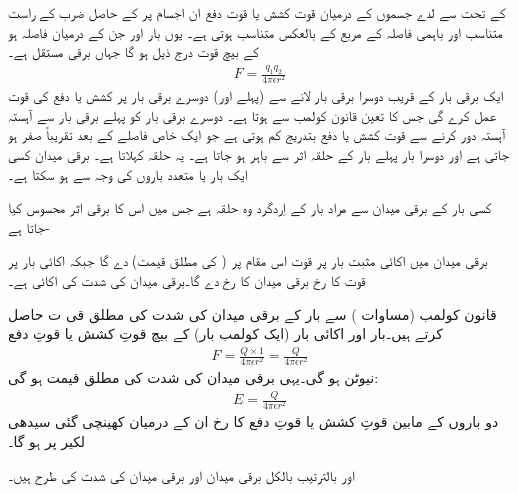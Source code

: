%
 کے تحت  سے لدے جسموں کے درمیان قوت کشش یا قوت دفع ان اجسام پر   کے حاصل ضرب کے راست متناسب اور باہمی فاصلہ کے مربع کے بالعکس متناسب ہوتی ہے۔ یوں بار  اور  جن کے درمیان فاصلہ  ہو کے بیچ قوت  درج ذیل ہو گا جہاں  برقی مستقل ہے۔ 
\begin{align}\label{مساوات_بنیادی_کولمب_کا_قانون}
F=\frac{q_1 q_2}{4 \pi \epsilon r^2}
\end{align}
ایک برقی بار کے قریب  دوسرا برقی بار لانے سے  (پہلے اور) دوسرے برقی بار پر کشش یا دفع کی قوت عمل کرے گی جس کا تعین قانون کولمب سے ہوتا ہے۔ دوسرے برقی بار کو پہلے برقی بار سے آہستہ آہستہ دور کرنے سے  قوت کشش یا دفع بتدریج کم ہوتی ہے جو ایک خاص فاصلے کے بعد تقریباً صفر ہو جاتی ہے اور دوسرا بار پہلے بار کے حلقہ اثر سے باہر ہو جاتا ہے۔ یہ حلقہ    کہلاتا ہے۔ برقی میدان کسی ایک بار یا متعدد  باروں کی وجہ سے ہو سکتا ہے۔ 

 کسی بار کے برقی میدان سے مراد بار کے اِردگرد وہ حلقہ ہے جس میں اس کا برقی اثر محسوس کیا جاتا ہے-

برقی میدان میں اکائی مثبت بار پر قوت اس مقام پر   ( کی مطلق قیمت) دے گا جبکہ اکائی بار پر قوت کا رخ برقی میدان کا رخ دے گا۔برقی میدان کی شدت کی اکائی  ہے۔

قانون کولمب (مساوات )   سے    بار کے برقی میدان کی شدت کی مطلق قی ت حاصل کرتے  ہیں۔بار   اور اکائی بار (ایک کولمب بار) کے بیچ  قوتِ کشش یا قوتِ دفع 
\begin{align}
F=\frac{Q \times 1}{4 \pi \epsilon r^2}=\frac{Q}{4\pi\epsilon r^2}
\end{align}
نیوٹن ہو گی۔یہی برقی میدان کی شدت کی مطلق قیمت ہو گی:
\begin{align}
E=\frac{Q}{4\pi\epsilon r^2}
\end{align}
دو باروں  کے مابین قوتِ کشش یا قوتِ دفع کا رخ ان کے درمیان کھینچی گئی سیدھی لکیر پر ہو گا۔

 اور  بالترتیب بالکل برقی میدان اور برقی میدان کی شدت کی طرح ہیں۔


